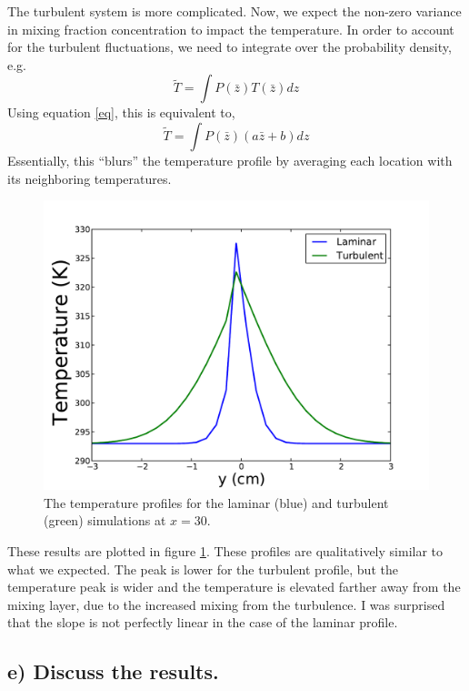 \documentclass{article}
\begin{document}
The turbulent system is more complicated. Now, we expect the non-zero
variance in mixing fraction concentration to impact the temperature. 
In order to account for the turbulent fluctuations, we need to integrate
over the probability density, e.g.
\begin{equation}
 \tilde T = \int P(\bar z) T(\bar z) dz
\end{equation}
Using equation \ref{eq}, this is equivalent to, 
\begin{equation}
 \tilde T = \int P(\bar z) (a \bar z + b) dz
\end{equation}
Essentially, this ``blurs'' the temperature profile by averaging each
location with its neighboring temperatures. 

  \begin{figure}[!htb]
   \begin{center}
    \includegraphics[width = 12 cm]{figs/temperature.pdf}
    \caption{The temperature profiles for the laminar (blue) and
    turbulent (green) simulations at $x=30$.}
    \label{temp}
   \end{center}
  \end{figure}

These results are plotted in figure \ref{temp}. These profiles are
qualitatively similar to what we expected. The peak is lower for the
turbulent profile, but the temperature peak is wider and the temperature
is elevated farther away from the mixing layer, due to the increased
mixing from the turbulence. I was surprised that the slope is
 not perfectly linear in the case of the laminar profile. 

\subsection*{e) Discuss the results.}
\end{document}
